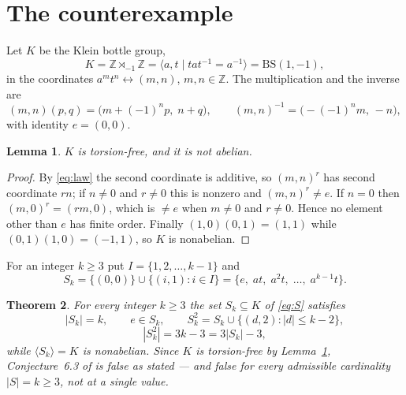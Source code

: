 \documentclass[11pt]{amsart}
\newtheorem{theorem}{Theorem}
\newtheorem{lemma}[theorem]{Lemma}
\theoremstyle{remark}
\begin{document}
\section{The counterexample}

Let $K$ be the Klein bottle group,
\[
  K=\mathbb{Z}\rtimes_{-1}\mathbb{Z}
   =\langle a,t\mid tat^{-1}=a^{-1}\rangle
   =\mathrm{BS}(1,-1),
\]
in the coordinates $a^{m}t^{n}\leftrightarrow(m,n)$, $m,n\in\mathbb{Z}$. The
multiplication and the inverse are
\begin{equation}\label{eq:law}
  (m,n)(p,q)=\bigl(m+(-1)^{n}p,\;n+q\bigr),
  \qquad
  (m,n)^{-1}=\bigl(-(-1)^{n}m,\,-n\bigr),
\end{equation}
with identity $e=(0,0)$.

\begin{lemma}\label{lem:tf}
$K$ is torsion-free, and it is not abelian.
\end{lemma}

\begin{proof}
By \eqref{eq:law} the second coordinate is additive, so $(m,n)^{r}$ has second
coordinate $rn$; if $n\ne0$ and $r\ne0$ this is nonzero and $(m,n)^{r}\ne e$. If
$n=0$ then $(m,0)^{r}=(rm,0)$, which is $\ne e$ when $m\ne0$ and $r\ne0$. Hence no
element other than $e$ has finite order. Finally $(1,0)(0,1)=(1,1)$ while
$(0,1)(1,0)=(-1,1)$, so $K$ is nonabelian.
\end{proof}

For an integer $k\ge3$ put $I=\{1,2,\dots,k-1\}$ and
\begin{equation}\label{eq:S}
  S_{k}=\{(0,0)\}\cup\{(i,1):i\in I\}
  =\{e,\;at,\;a^{2}t,\;\dots,\;a^{k-1}t\}.
\end{equation}

\begin{theorem}\label{thm:main}
For every integer $k\ge3$ the set $S_{k}\subseteq K$ of \eqref{eq:S} satisfies
\[
  |S_{k}|=k,\qquad e\in S_{k},\qquad
  S_{k}^{2}=S_{k}\cup\{(d,2):|d|\le k-2\},
\]
\[
  |S_{k}^{2}|=3k-3=3|S_{k}|-3,
\]
while $\langle S_{k}\rangle=K$ is nonabelian. Since $K$ is torsion-free by
Lemma~\ref{lem:tf}, Conjecture~6.3 of \cite{MN} is false as stated --- and false
for every admissible cardinality $|S|=k\ge3$, not at a single value.
\end{theorem}
\end{document}
